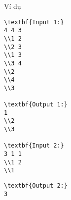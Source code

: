 Ví dụ
\begin{verbatim}
\textbf{Input 1:}
4 4 3
\\1 2
\\2 3
\\1 3
\\3 4
\\2
\\4
\\3

\textbf{Output 1:}
1
\\2
\\3

\textbf{Input 2:}
3 1 1
\\1 2
\\1 \end{verbatim}
\begin{verbatim}
\textbf{Output 2:}
3\end{verbatim}